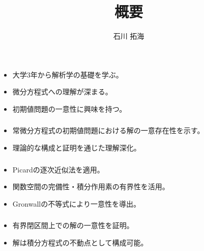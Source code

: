 \documentclass[12pt]{beamer}
\title{概要}
\author{石川 拓海}
\date{}
\begin{document}
\begin{frame}
\titlepage
\end{frame}

\begin{frame}
\frametitle{}
\begin{itemize}
    \item 大学3年から解析学の基礎を学ぶ。
    \item 微分方程式への理解が深まる。
    \item 初期値問題の一意性に興味を持つ。
\end{itemize}
\end{frame}

\begin{frame}
\frametitle{}
\begin{itemize}
    \item 常微分方程式の初期値問題における解の一意存在性を示す。
    \item 理論的な構成と証明を通じた理解深化。
\end{itemize}
\end{frame}

\begin{frame}
\frametitle{}
\begin{itemize}
    \item Picardの逐次近似法を適用。
    \item 関数空間の完備性・積分作用素の有界性を活用。
    \item Gronwallの不等式により一意性を導出。
\end{itemize}
\end{frame}

\begin{frame}
\frametitle{}
\begin{itemize}
    \item 有界閉区間上での解の一意性を証明。
    \item 解は積分方程式の不動点として構成可能。
\end{itemize}
\end{frame}
\end{document}
